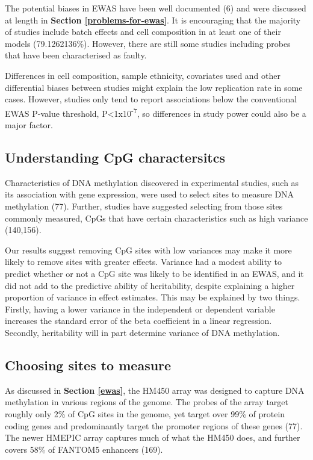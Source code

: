 \documentclass[11pt,oneside]{bristolthesis}
\begin{document}
The potential biases in EWAS have been well documented (6) and were discussed at length in \textbf{Section \ref{problems-for-ewas}}. It is encouraging that the majority of studies include batch effects and cell composition in at least one of their models (79.1262136\%). However, there are still some studies including probes that have been characterised as faulty.

Differences in cell composition, sample ethnicity, covariates used and other differential biases between studies might explain the low replication rate in some cases. However, studies only tend to report associations below the conventional EWAS P-value threshold, P\textless1x10\textsuperscript{-7}, so differences in study power could also be a major factor.

\hypertarget{understanding-cpg-characteristics}{%
\subsection{Understanding CpG charactersitcs}\label{understanding-cpg-characteristics}}

Characteristics of DNA methylation discovered in experimental studies, such as its association with gene expression, were used to select sites to measure DNA methylation (77). Further, studies have suggested selecting from those sites commonly measured, CpGs that have certain characteristics such as high variance (140,156).

Our results suggest removing CpG sites with low variances may make it more likely to remove sites with greater effects. Variance had a modest ability to predict whether or not a CpG site was likely to be identified in an EWAS, and it did not add to the predictive ability of heritability, despite explaining a higher proportion of variance in effect estimates. This may be explained by two things. Firstly, having a lower variance in the independent or dependent variable increases the standard error of the beta coefficient in a linear regression. Secondly, heritability will in part determine variance of DNA methylation.

\hypertarget{choosing-sites-to-measure}{%
\subsection{Choosing sites to measure}\label{choosing-sites-to-measure}}

As discussed in \textbf{Section \ref{ewas}}, the HM450 array was designed to capture DNA methylation in various regions of the genome. The probes of the array target roughly only 2\% of CpG sites in the genome, yet target over 99\% of protein coding genes and predominantly target the promoter regions of these genes (77). The newer HMEPIC array captures much of what the HM450 does, and further covers 58\% of FANTOM5 enhancers (169).
\end{document}
